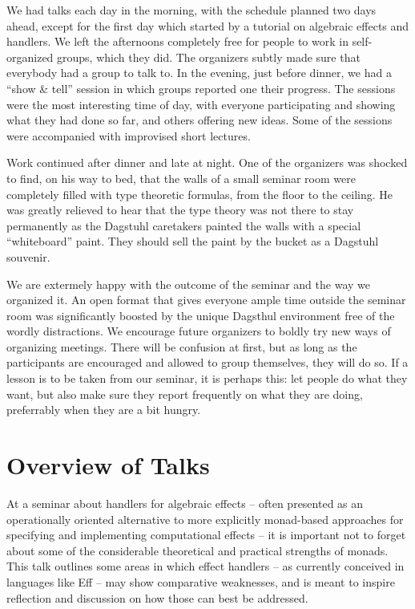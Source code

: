 \documentclass[a4paper,UKenglish]{dagrep}
\begin{document}
We had talks each day in the morning, with the schedule planned two days ahead, except for
the first day which started by a tutorial on algebraic effects and handlers. We left the
afternoons completely free for people to work in self-organized groups, which they did.
The organizers subtly made sure that everybody had a group to talk to. In the evening,
just before dinner, we had a ``show \& tell'' session in which groups reported one their
progress. The sessions were the most interesting time of day, with everyone participating
and showing what they had done so far, and others offering new ideas. Some of the sessions
were accompanied with improvised short lectures.

Work continued after dinner and late at night. One of the organizers was shocked to find,
on his way to bed, that the walls of a small seminar room were completely filled with type
theoretic formulas, from the floor to the ceiling. He was greatly relieved to hear that
the type theory was not there to stay permanently as the Dagstuhl caretakers painted the
walls with a special ``whiteboard'' paint. They should sell the paint by the bucket as a
Dagstuhl souvenir.

We are extermely happy with the outcome of the seminar and the way we organized it. An
open format that gives everyone ample time outside the seminar room was significantly
boosted by the unique Dagsthul environment free of the wordly distractions. We encourage
future organizers to boldly try new ways of organizing meetings. There will be confusion
at first, but as long as the participants are encouraged and allowed to group themselves,
they will do so. If a lesson is to be taken from our seminar, it is perhaps this: let
people do what they want, but also make sure they report frequently on what they are
doing, preferrably when they are a bit hungry.

\tableofcontents



\section{Overview of Talks}

\license

At a seminar about handlers for algebraic effects -- often presented as an operationally oriented alternative to more explicitly monad-based approaches for specifying and implementing computational effects -- it is important not to forget about some of the considerable theoretical and practical strengths of monads.  This talk outlines some areas in which effect handlers -- as currently conceived in languages like Eff -- may show comparative weaknesses, and is meant to inspire reflection and discussion on how those can best be addressed.
\end{document}
